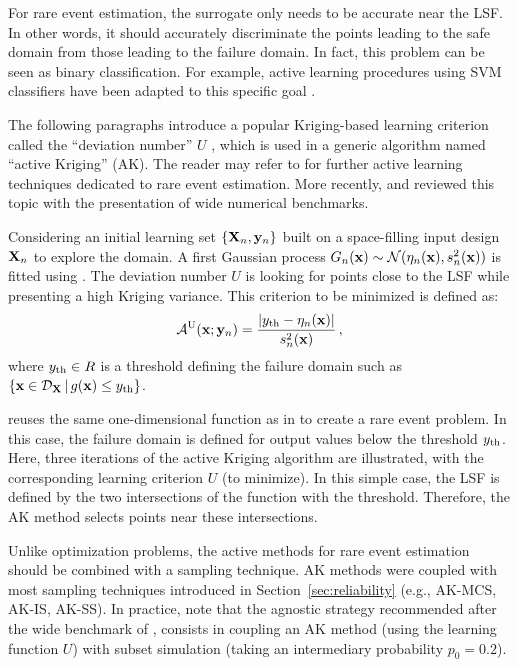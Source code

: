 For rare event estimation, the surrogate only needs to be accurate near the LSF. 
In other words, it should accurately discriminate the points leading to the safe domain from those leading to the failure domain. 
In fact, this problem can be seen as binary classification. 
For example, active learning procedures using SVM classifiers have been adapted to this specific goal \citep{bourinet_2018}. 

The following paragraphs introduce a popular Kriging-based learning criterion called the ``deviation number'' $U$ \citep{echard_2011}, which is used in a generic algorithm named ``active Kriging'' (AK). 
The reader may refer to \citet{MorioBalesdent2015} for further active learning techniques dedicated to rare event estimation. 
More recently, \citet{teixeira_2021} and \citet{moustapha_ss_2022} reviewed this topic with the presentation of wide numerical benchmarks.

Considering an initial learning set $\left\{{\bf X}_n, {\bf y}_n\right\}$ built on a space-filling input design ${\bf X}_n$ to explore the domain. 
A first Gaussian process $G_n({\bf x}) \sim \mathcal{N}(\eta_n({\bf x}), s_n^2({\bf x}))$ is fitted using . 
The deviation number $U$ is looking for points close to the LSF while presenting a high Kriging variance. 
This criterion to be minimized is defined as:   
\begin{equation}
    \mathcal{A}^{\textrm{U}}({\bf x}; {\bf y}_n) = \frac{\left|y_\mathrm{th} - \eta_n({\bf x})\right|}{s_n^2({\bf x})}\, , 
    \label{eq:U}
\end{equation}
where $y_\mathrm{th} \in R$ is a threshold defining the failure domain such as $\{{\bf x} \in \mathcal{D}_{\bf X} \, | \, g({\bf x}) \leq y_\mathrm{th}\}$. 

 reuses the same one-dimensional function as in  to create a rare event problem. 
In this case, the failure domain is defined for output values below the threshold $y_\mathrm{th}$. 
Here, three iterations of the active Kriging algorithm are illustrated, with the corresponding learning criterion $U$ (to minimize). 
In this simple case, the LSF is defined by the two intersections of the function with the threshold. 
Therefore, the AK method selects points near these intersections. 


Unlike optimization problems, the active methods for rare event estimation should be combined with a sampling technique. 
AK methods were coupled with most sampling techniques introduced in Section~\ref{sec:reliability} (e.g., AK-MCS, AK-IS, AK-SS). 
In practice, note that the agnostic strategy recommended after the wide benchmark of \citet{moustapha_ss_2022}, consists in coupling an AK method (using the learning function $U$) with subset simulation (taking an intermediary probability $p_0 =0.2$). 

